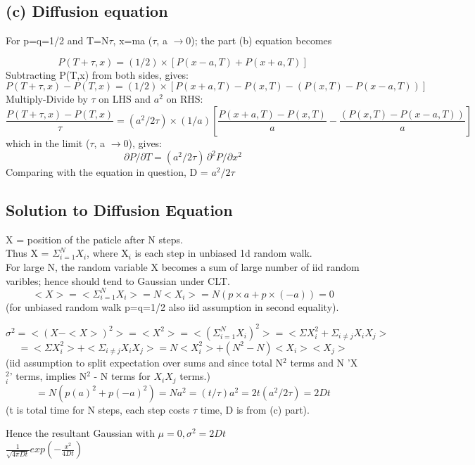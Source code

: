 \documentclass[11pt]{article}
\begin{document}
	\subsection*{(c) Diffusion equation}
	For p=q=1/2 and T=N\(\tau\), x=ma (\(\tau\), a \(\rightarrow\)0); the part (b) equation becomes
	
	\[
		P(T+\tau, x) = (1/2)\times [P(x-a,T)+P(x+a,T)]
	\]
	Subtracting P(T,x) from both sides, gives:
	\[
		P(T+\tau, x)- P(T,x) = (1/2)\times [P(x+a,T)-P(x,T)-(P(x,T)-P(x-a,T))]
	\]
	Multiply-Divide by \(\tau\) on LHS and \( a^2\) on RHS:
	\[
			\frac{P(T+\tau, x)- P(T,x)}{\tau} = (a^2/2\tau)\times (1/a)[\frac{P(x+a,T)-P(x,T)}{a}-\frac{(P(x,T)-P(x-a,T))}{a}]
	\]
	which in the limit (\(\tau\), a \(\rightarrow\)0), gives:
	\[
		\partial P/\partial T = (a^2/2\tau) \, \partial^2 P/\partial x^2
	\]
	Comparing with the equation in question, D = \(a^2/2\tau\)
	
	\subsection*{Solution to Diffusion Equation}
	
	X = position of the paticle after N steps.\\
	Thus X = \(\Sigma_{i=1}^N X_i\), where X$_i$ is each step in unbiased 1d random walk.\\
	For large N, the random variable X becomes a sum of large number of iid random varibles; hence should tend to Gaussian under CLT.
	\[
		<X> = <\Sigma_{i=1}^N X_i> = N<X_i> = N(p\times a + p\times(-a)) = 0 
	\](for unbiased random walk p=q=1/2 also iid assumption in second equality).
	
	\[
		\sigma^2 = <(X-<X>)^2> = <X^2> = <(\Sigma_{i=1}^N X_i)^2> = <\Sigma X_i^2 + \Sigma_{i \neq j} X_i X_j >
	\]
	\[
		 = <\Sigma X_i^2> + <\Sigma_{i \neq j} X_i X_j> = N<X_i^2> + (N^2-N) <X_i><X_j>   
	\]
	(iid assumption to split expectation over sums and since total N$^2$ terms and N 'X$_i^2$' terms, implies N$^2$ - N terms for $X_i X_j$ terms.) 
	\[
		= N(p (a)^2 + p(-a)^2) = Na^2 =(t/\tau) a^2 = 2t (a^2/2\tau) = 2Dt
	\](t is total time for N steps, each step costs $\tau$ time, D is from (c) part).
	
	Hence the resultant Gaussian with $\boxed{\mu = 0, \sigma^2 = 2Dt}$\\
	\(\boxed{ \frac{1}{\sqrt{4\pi Dt}} exp(-\frac{x^2}{4Dt})}\)
	
\end{document}
